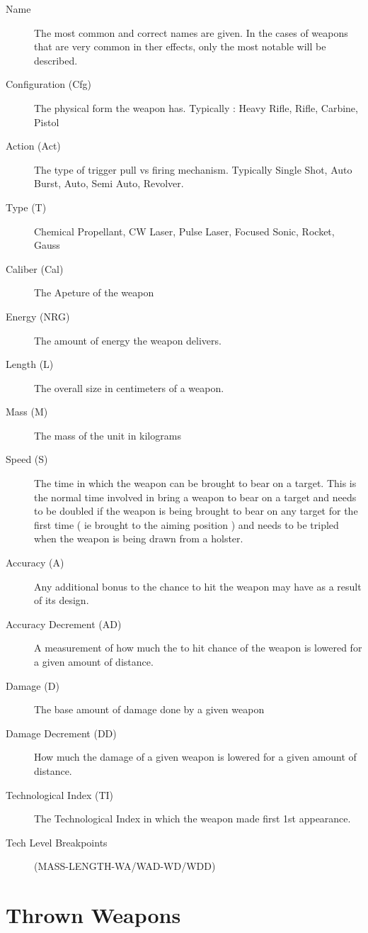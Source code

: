 \begin{description}
	\item[Name]
	The most common and correct names are given. In the cases of weapons
	that are very common in ther effects, only the most notable will be
	described.
	\item[Configuration (Cfg)]
	The physical form the weapon has. Typically : Heavy Rifle, Rifle, 
	Carbine, Pistol 
	\item[Action (Act)]
	The type of trigger pull vs firing mechanism. Typically Single Shot, Auto Burst,
	Auto, Semi Auto, Revolver.
	\item[Type (T)]
	Chemical Propellant, CW Laser, Pulse Laser, Focused Sonic, Rocket, Gauss
	\item[Caliber (Cal)]
	The Apeture of the weapon
	\item[Energy (NRG)]
	The amount of energy the weapon delivers.
	\item[Length (L)]
	The overall size in centimeters of a weapon.
	\item[Mass (M)]
	The mass of the unit in kilograms
	\item[Speed (S)]
	The time in which the weapon can be brought to bear on a target. This is
	the normal time involved in bring a weapon to bear on a target and needs
	to be doubled if the weapon is being brought to bear on any target for
	the first time ( ie brought to the aiming position ) and needs to be tripled
	when the weapon is being drawn from a holster.
	\item[Accuracy (A)]
	Any ad\-di\-tional bonus to the chance to hit the weapon may have as a
	result of its design.
	\item[Accuracy Decrement (AD)]
	A measurement of how much the to hit chance of the weapon is lowered for
	a given amount of distance.
	\item[Damage (D)]
	The base amount of dam\-age done by a given weapon
	\item[Damage Decrement  (DD)]
	How much the damage of a given weapon is lowered for a given amount of
	distance.
	\item[Technological Index (TI)]
	The Technological Index in which the weapon made first 1st appearance.
	\item[Tech Level Breakpoints]
	(MASS-LENGTH-WA/WAD-WD/WDD)
\end{description}

\clearpage
\section{Thrown Weapons}

